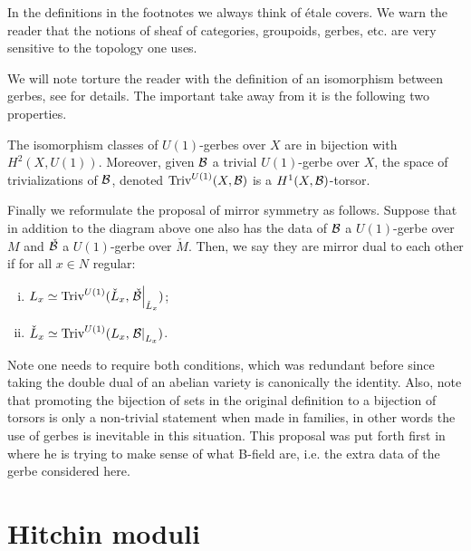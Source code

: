 \begin{rem*}
In the definitions in the footnotes we always think of \'etale
covers. We warn the reader that the notions of sheaf of categories,
groupoids, gerbes, etc. are very sensitive to the topology one uses.
\end{rem*}

We will note torture the reader with the definition of an isomorphism
between gerbes, see \cite{Br,DG} for details. The important take away
from it is the following two properties.

\begin{prop}
The isomorphism classes of $U(1)$-gerbes over $X$ are in bijection with
$H^2(X,U(1))$. Moreover, given $\mathcal{B}$ a trivial $U(1)$-gerbe over $X$,
the space of trivializations of $\mathcal{B}$, denoted
$\mbox{Triv}^{U(1)}(X,\mathcal{B})$ is a $H^1(X,\mathcal{B})$-torsor.
\end{prop}

Finally we reformulate the proposal of mirror symmetry as
follows. Suppose that in addition to the diagram above one also has
the data of $\mathcal{B}$ a $U(1)$-gerbe over $M$ and $\check{\mathcal{B}}$ a
$U(1)$-gerbe over $\check{M}$. Then, we say they are mirror dual to
each other if for all $x \in N$ regular:
\begin{enumerate}[(i)]
\item $L_x \simeq
  \mbox{Triv}^{U(1)}(\check{L}_x,\left.\check{\mathcal{B}}\right|_{\check{L}_x})$;
\item $\check{L}_x \simeq
  \mbox{Triv}^{U(1)}(L_x,\left.\mathcal{B}\right|_{L_x})$.
\end{enumerate}

\begin{rem*}
Note one needs to require both conditions, which was redundant before
since taking the double dual of an abelian variety is canonically
the identity.
Also, note that promoting the bijection of sets in the original
definition to a bijection of torsors is only a non-trivial statement
when made in families, in other words the use of gerbes is inevitable
in this situation.
This proposal was put forth first in \cite{H5} where he is trying to
make sense of what B-field are, i.e. the extra data of the gerbe
considered here.
\end{rem*}

\section{Hitchin moduli}

